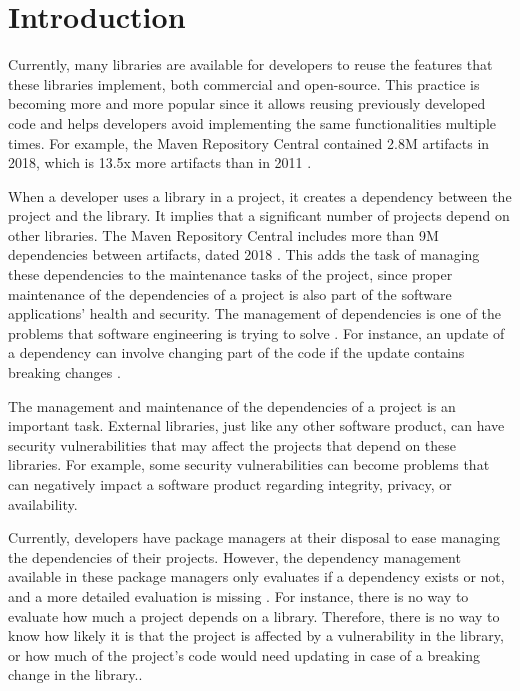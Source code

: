 \chapter{Introduction}\label{ch:Introduction}

Currently, many libraries are available for developers to reuse the features that these libraries implement, both commercial and open-source. This practice is becoming more and more popular since it allows reusing previously developed code and helps developers avoid implementing the same functionalities multiple times. For example, the Maven Repository Central contained 2.8M artifacts in 2018, which is 13.5x more artifacts than in 2011  \cite{Benelallam2019}.

When a developer uses a library in a project, it creates a dependency between the project and the library. It implies that a significant number of projects depend on other libraries. The Maven Repository Central includes more than 9M dependencies between artifacts, dated 2018 \cite{Benelallam2019}. This adds the task of managing these dependencies to the maintenance tasks of the project, since proper maintenance of the dependencies of a project is also part of the software applications' health and security. The management of dependencies is one of the problems that software engineering is trying to solve \cite{kula2014visualizing}. For instance, an update of a dependency can involve changing part of the code if the update contains breaking changes \cite{Raemaekers2017}.

The management and maintenance of the dependencies of a project is an important task. External libraries, just like any other software product, can have security vulnerabilities that may affect the projects that depend on these libraries. For example, some security vulnerabilities can become problems that can negatively impact a software product regarding integrity, privacy, or availability.

\blankl
Currently, developers have package managers at their disposal to ease managing the dependencies of their projects. However, the dependency management available in these package managers only evaluates if a dependency exists or not, and a more detailed evaluation is missing \cite{hejderup2018prazi}. For instance, there is no way to evaluate how much a project depends on a library. Therefore, there is no way to know how likely it is that the project is affected by a vulnerability in the library, or how much of the project's code would need updating in case of a breaking change in the library..

